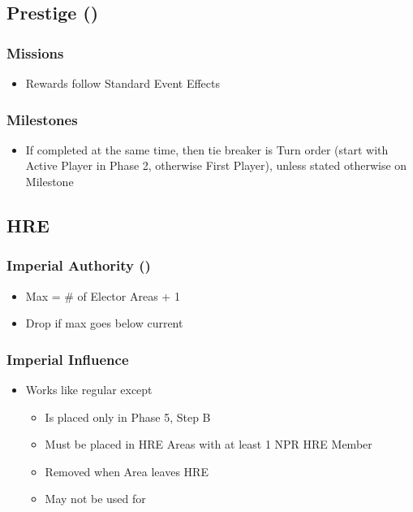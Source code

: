 \documentclass[10pt]{article}
\begin{document}
\subsection*{Prestige (\prestige) }

\subsubsection*{Missions }
\begin{itemize}
	\item Rewards follow Standard Event Effects
\end{itemize}

\subsubsection*{Milestones }
\begin{itemize}
	\item If completed at the same time, then tie breaker is Turn order (start with Active Player in Phase 2, otherwise First Player), unless stated otherwise on Milestone
\end{itemize}

\subsection*{HRE }
\subsubsection*{Imperial Authority (\authority) }
\begin{itemize}
	\item Max \authority = \# of Elector Areas + 1
	\item Drop \authority if max \authority goes below current \authority
\end{itemize}

\subsubsection*{Imperial Influence }
\begin{itemize}
	\item Works like regular \influence except
	\begin{itemize}
		\item Is placed only in Phase 5, Step B
		\item Must be placed in HRE Areas with at least 1 NPR HRE Member
		\item Removed when Area leaves HRE
		\item May not be used for 
	\end{itemize}
\end{itemize}
\end{document}
